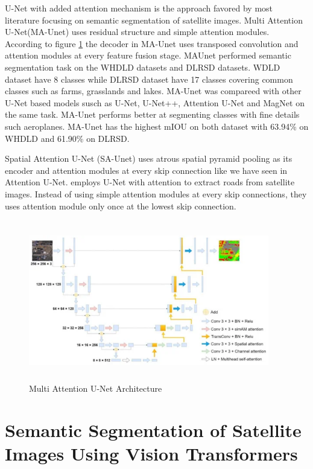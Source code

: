 U-Net with added attention mechanism is the approach favored by most literature focusing on semantic segmentation of satellite images. Multi Attention U-Net(MA-Unet) \cite{multi-attention-unet}  uses residual structure and simple attention modules. According to figure \ref{fig:maunet} the decoder in MA-Unet uses transposed convolution and attention modules at every feature fusion stage. MAUnet performed semantic segmentation task on the WHDLD datasets and DLRSD datasets. WDLD dataset have 8 classes while DLRSD dataset have 17 classes covering common classes such as farms, grasslands and lakes. MA-Unet was compareed with other U-Net based models susch as U-Net, U-Net++, Attention U-Net and MagNet on the same task. MA-Unet performs better at segmenting classes with fine details such aeroplanes. MA-Unet has the highest mIOU on both dataset with 63.94\% on WHDLD and 61.90\% on DLRSD.

Spatial Attention U-Net (SA-Unet) \cite{improved-unet} uses atrous spatial pyramid pooling as its encoder and attention modules at every skip connection like we have seen in Attention U-Net.  \cite{attention-unet-road} employs U-Net with attention to extract roads from satellite images. Instead of using simple attention modules at every skip connections, they uses attention module only once at the lowest skip connection.

\begin{figure}[ht]
\includegraphics[width=10.5cm, height=7cm]{images/maunet.png}
\centering
\caption{Multi Attention U-Net Architecture}
\label{fig:maunet}
\end{figure}

\section{Semantic Segmentation of Satellite Images Using Vision Transformers}

